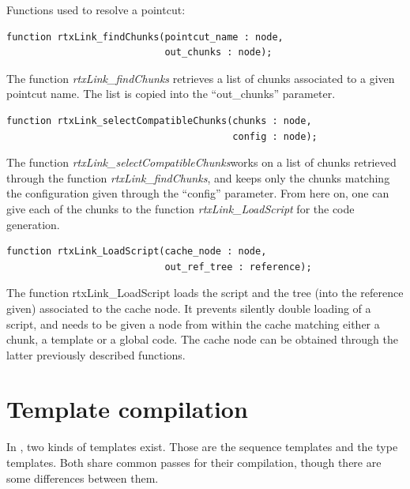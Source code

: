 \documentclass[american]{rtxreport}
\begin{document}
\vspace{20pt}

Functions used to resolve a pointcut:
\begin{lstlisting}
function rtxLink_findChunks(pointcut_name : node,
                            out_chunks : node);
\end{lstlisting}
The function \emph{rtxLink\_findChunks} retrieves a list of chunks associated
to a given pointcut name. The list is copied into the ``out\_chunks''
parameter.


\begin{lstlisting}
function rtxLink_selectCompatibleChunks(chunks : node,
                                        config : node);
\end{lstlisting} The function \emph{rtxLink\_selectCompatibleChunks}works on a
list of chunks retrieved through the function \emph{rtxLink\_findChunks}, and
keeps only the chunks matching the configuration given through the ``config''
parameter. From here on, one can give each of the chunks to the function
\emph{rtxLink\_LoadScript} for the code generation.


\begin{lstlisting}
function rtxLink_LoadScript(cache_node : node,
                            out_ref_tree : reference);
\end{lstlisting}
The function rtxLink\_LoadScript loads the script and the tree (into the
reference given) associated to the cache node. It prevents silently double
loading of a script, and needs to be given a node from within the cache
matching either a chunk, a template or a global code. The cache node can be
obtained through the latter previously described functions.




%
%

\section{Template compilation}

In \rtx, two kinds of templates exist. Those are the sequence templates and the
type templates. Both share common passes for their compilation, though there
are some differences between them.
\end{document}
